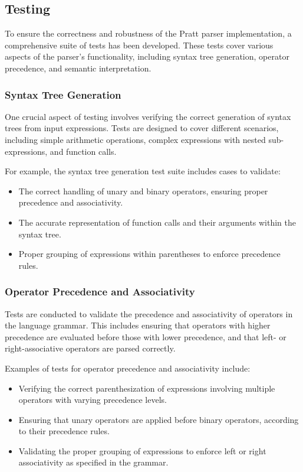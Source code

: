 \documentclass[english, 
               brazil, 
               bsc] %
               {dcomp-abntex2}
\begin{document}
\subsection{Testing}

To ensure the correctness and robustness of the Pratt parser implementation, a comprehensive suite of tests has been developed. These tests cover various aspects of the parser's functionality, including syntax tree generation, operator precedence, and semantic interpretation.

\subsubsection{Syntax Tree Generation}

One crucial aspect of testing involves verifying the correct generation of syntax trees from input expressions. Tests are designed to cover different scenarios, including simple arithmetic operations, complex expressions with nested sub-expressions, and function calls.

For example, the syntax tree generation test suite includes cases to validate:

\begin{itemize}
    \item The correct handling of unary and binary operators, ensuring proper precedence and associativity.
    \item The accurate representation of function calls and their arguments within the syntax tree.
    \item Proper grouping of expressions within parentheses to enforce precedence rules.
\end{itemize}

\subsubsection{Operator Precedence and Associativity}

Tests are conducted to validate the precedence and associativity of operators in the language grammar. This includes ensuring that operators with higher precedence are evaluated before those with lower precedence, and that left- or right-associative operators are parsed correctly.

Examples of tests for operator precedence and associativity include:

\begin{itemize}
    \item Verifying the correct parenthesization of expressions involving multiple operators with varying precedence levels.
    \item Ensuring that unary operators are applied before binary operators, according to their precedence rules.
    \item Validating the proper grouping of expressions to enforce left or right associativity as specified in the grammar.
\end{itemize}
\end{document}
